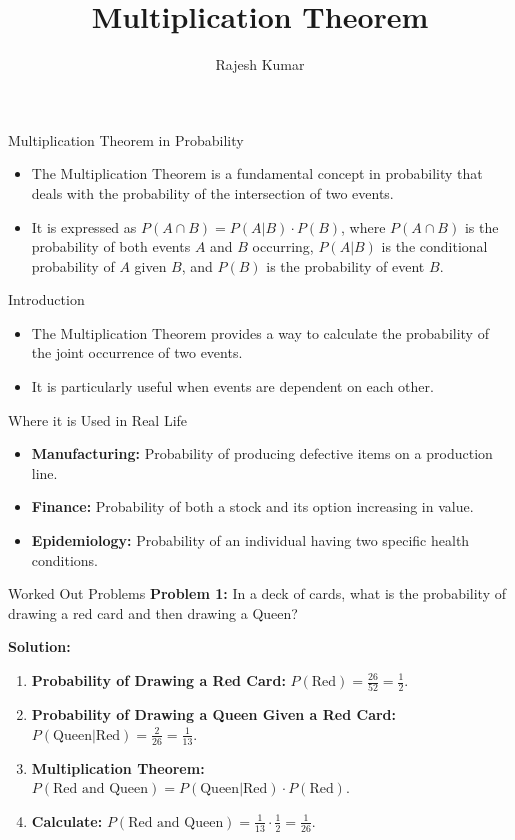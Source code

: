 
\title{Multiplication Theorem}
\author{Rajesh Kumar}
\date{}

\begin{frame}
  \titlepage
\end{frame}

\begin{frame}{Multiplication Theorem in Probability}
  \begin{itemize}
    \item The Multiplication Theorem is a fundamental concept in probability that deals with the probability of the intersection of two events.
    \item It is expressed as \(P(A \cap B) = P(A|B) \cdot P(B)\), where \(P(A \cap B)\) is the probability of both events \(A\) and \(B\) occurring, \(P(A|B)\) is the conditional probability of \(A\) given \(B\), and \(P(B)\) is the probability of event \(B\).
  \end{itemize}
\end{frame}

\begin{frame}{Introduction}
  \begin{itemize}
    \item The Multiplication Theorem provides a way to calculate the probability of the joint occurrence of two events.
    \item It is particularly useful when events are dependent on each other.
  \end{itemize}
\end{frame}

\begin{frame}{Where it is Used in Real Life}
  \begin{itemize}
    \item \textbf{Manufacturing:} Probability of producing defective items on a production line.
    \item \textbf{Finance:} Probability of both a stock and its option increasing in value.
    \item \textbf{Epidemiology:} Probability of an individual having two specific health conditions.
  \end{itemize}
\end{frame}

\begin{frame}{Worked Out Problems}
  \textbf{Problem 1:} In a deck of cards, what is the probability of drawing a red card and then drawing a Queen?

  \textbf{Solution:}
  \begin{enumerate}
    \item \textbf{Probability of Drawing a Red Card:} \(P(\text{Red}) = \frac{26}{52} = \frac{1}{2}\).
    \item \textbf{Probability of Drawing a Queen Given a Red Card:} \(P(\text{Queen}|\text{Red}) = \frac{2}{26} = \frac{1}{13}\).
    \item \textbf{Multiplication Theorem:} \(P(\text{Red and Queen}) = P(\text{Queen}|\text{Red}) \cdot P(\text{Red})\).
    \item \textbf{Calculate:} \(P(\text{Red and Queen}) = \frac{1}{13} \cdot \frac{1}{2} = \frac{1}{26}\).
  \end{enumerate}
\end{frame}

